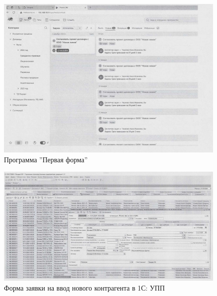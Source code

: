 


\begin{figure}
\begin{center}
\includegraphics[height=0.45\textheight, width=1.5\textwidth, keepaspectratio]{Pics/I.5.2..jpg}
\end{center}
\caption{Программа ''Первая форма''}
\label{pic:I.5.2..jpg}
\end{figure}
\clearpage

\begin{figure}
\begin{center}
\includegraphics[height=0.35\textheight, width=1.5\textwidth, angle=90, keepaspectratio]{Pics/I.5.2.jpg}
\end{center}
\caption{Форма заявки на ввод нового контрагента в 1С: УПП}
\label{pic:I.5.2.jpg}
\end{figure}
\clearpage


